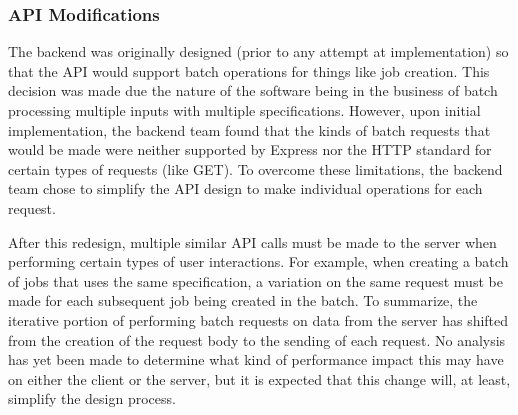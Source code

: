 \subsubsection{API Modifications}
The backend was originally designed (prior to any attempt at implementation) so that the API would support batch operations for things like job creation. This decision was made due the nature of the software being in the business of batch processing multiple inputs with multiple specifications. However, upon initial implementation, the backend team found that the kinds of batch requests that would be made were neither supported by Express nor the HTTP standard for certain types of requests (like GET). To overcome these limitations, the backend team chose to simplify the API design to make individual operations for each request.\par
After this redesign, multiple similar API calls must be made to the server when performing certain types of user interactions. For example, when creating a batch of jobs that uses the same specification, a variation on the same request must be made for each subsequent job being created in the batch. To summarize, the iterative portion of performing batch requests on data from the server has shifted from the creation of the request body to the sending of each request. No analysis has yet been made to determine what kind of performance impact this may have on either the client or the server, but it is expected that this change will, at least, simplify the design process.\par
